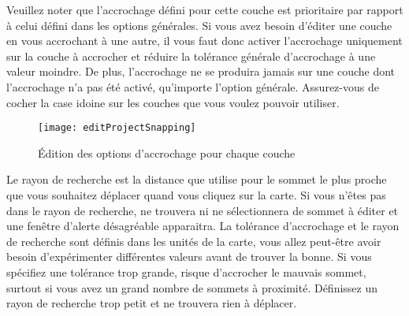 Veuillez noter que l'accrochage défini pour cette couche est prioritaire par rapport à celui défini dans les options générales. Si vous avez besoin d'éditer une couche en vous accrochant à une autre, il vous faut donc activer l'accrochage uniquement sur la couche à accrocher et réduire la tolérance générale d'accrochage à une valeur moindre. De plus, l'accrochage ne se produira jamais sur une couche dont l'accrochage n'a pas été activé, qu'importe l'option générale. Assurez-vous de cocher la case idoine sur les couches que vous voulez pouvoir utiliser.

\begin{figure}[H]
  \begin{center}
  \texttt{[image: editProjectSnapping]}
  \caption{Édition des options d'accrochage pour chaque couche \nixcaption}\label{fig:snappingoptions}
\end{center}
\end{figure}


Le rayon de recherche est la distance que \qg utilise pour  le sommet le plus proche que vous souhaitez déplacer quand vous cliquez sur la carte. Si vous n'êtes pas dans le rayon de recherche, \qg ne trouvera ni ne sélectionnera de sommet à éditer et une fenêtre d'alerte désagréable apparaitra. La tolérance d'accrochage et le rayon de recherche sont définis dans les unités de la carte, vous allez peut-être avoir besoin d'expérimenter différentes valeurs avant de trouver la bonne. Si vous spécifiez une tolérance trop grande, \qg risque d'accrocher le mauvais sommet, surtout si vous avez un grand nombre de sommets à proximité. Définissez un rayon de recherche trop petit et \qg ne trouvera rien à déplacer.

